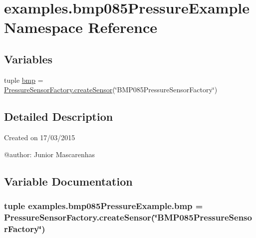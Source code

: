 \hypertarget{namespaceexamples_1_1bmp085PressureExample}{}\section{examples.\+bmp085\+Pressure\+Example Namespace Reference}
\label{namespaceexamples_1_1bmp085PressureExample}
\subsection*{Variables}
\begin{DoxyCompactItemize}
\item 
tuple \hyperlink{namespaceexamples_1_1bmp085PressureExample_a8dc596a71ce8777d7f85c8909efec6a4}{bmp} = \hyperlink{classconcretefactory_1_1pressureSensorFactory_1_1PressureSensorFactory_ace7ec33119f657b5239aae933dbd91bf}{Pressure\+Sensor\+Factory.\+create\+Sensor}(\char`\"{}B\+M\+P085\+Pressure\+Sensor\+Factory\char`\"{})
\end{DoxyCompactItemize}


\subsection{Detailed Description}
\begin{DoxyVerb}Created on 17/03/2015

@author: Junior Mascarenhas
\end{DoxyVerb}
 

\subsection{Variable Documentation}
\hypertarget{namespaceexamples_1_1bmp085PressureExample_a8dc596a71ce8777d7f85c8909efec6a4}{}
\subsubsection[{bmp}]{\setlength{\rightskip}{0pt plus 5cm}tuple examples.\+bmp085\+Pressure\+Example.\+bmp = {\bf Pressure\+Sensor\+Factory.\+create\+Sensor}(\char`\"{}B\+M\+P085\+Pressure\+Sensor\+Factory\char`\"{})}\label{namespaceexamples_1_1bmp085PressureExample_a8dc596a71ce8777d7f85c8909efec6a4}
